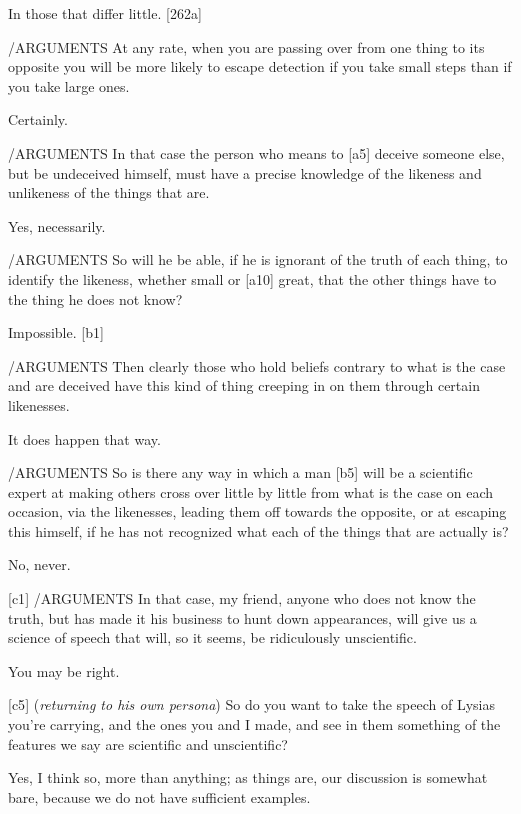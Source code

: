  In those that differ little. {[}262a{]}

/ARGUMENTS At any rate, when you are passing over from one thing
to its opposite you will be more likely to escape detection if you take
small steps than if you take large ones.

 Certainly.

/ARGUMENTS In that case the person who means to {[}a5{]} deceive
someone else, but be undeceived himself, must have a precise knowledge
of the likeness and unlikeness of the things that
are.

 Yes, necessarily.

/ARGUMENTS So will he be able, if he is ignorant of the truth of
each thing, to identify the likeness, whether small or {[}a10{]} great,
that the other things have to the thing he does not know?

 Impossible. {[}b1{]}

/ARGUMENTS Then clearly those who hold beliefs contrary to what
is the case and are deceived have this kind of thing creeping in on them
through certain likenesses.

 It does happen that way.

/ARGUMENTS So is there any way in which a man {[}b5{]} will be a
scientific expert at making others cross over little by little from what
is the case on each occasion, via the likenesses, leading them off
towards the opposite, or at escaping this himself, if he has not
recognized what each of the things that are actually is?

 No, never.

{[}c1{]} /ARGUMENTS In that case, my friend, anyone who does not
know the truth, but has made it his business to hunt down appearances,
will give us a science of speech that will, so it seems, be ridiculously
unscientific.

 You may be right.

{[}c5{]}  ({\em returning to his own persona}) So do you want to
take the speech of Lysias you're carrying, and the ones you and I
made, and see in them
something of the features we say are scientific and unscientific?

 Yes, I think so, more than anything; as things are, our
discussion is somewhat bare, because we do not have sufficient examples.

